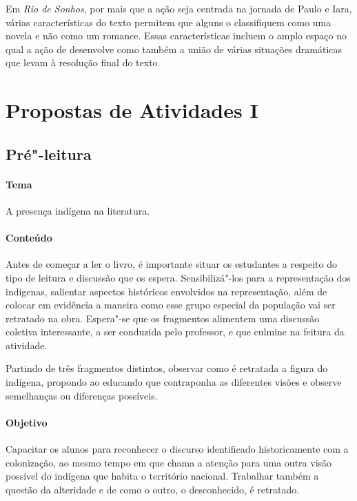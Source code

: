 \documentclass[12pt]{extarticle}
\begin{document}
Em \textit{Rio de Sonhos}, por mais que a ação seja centrada na jornada de Paulo e Iara,  
várias características do texto permitem que alguns o classifiquem como uma novela e não 
como um romance.
Essas características incluem o amplo espaço no qual a ação de desenvolve como também a união de várias situações dramáticas  que levam à resolução final do texto.


\section{Propostas de Atividades I}
\subsection{Pré"-leitura}

\paragraph{Tema} A presença indígena na literatura.

\paragraph{Conteúdo}  
Antes de começar a ler o livro, é importante situar os estudantes a
respeito do tipo de leitura e discussão que os espera. Sensibilizá"-los
para a representação dos indígenas, salientar aspectos históricos
envolvidos na representação, além de colocar em evidência a maneira como
esse grupo especial da população vai ser retratado na obra. Espera"-se
que os fragmentos alimentem uma discussão coletiva interessante, a ser
conduzida pelo professor, e que culmine na feitura da atividade.


Partindo de três fragmentos distintos, observar como é retratada a
figura do indígena, propondo ao educando que contraponha as diferentes
visões e observe semelhanças ou diferenças possíveis.

\paragraph{Objetivo}
Capacitar os alunos para reconhecer o discurso identificado
historicamente com a colonização, ao mesmo tempo em que chama a
atenção para uma outra visão possível do indígena que habita o
território nacional. Trabalhar também a questão da alteridade e de
como o outro, o desconhecido, é retratado.
\end{document}

